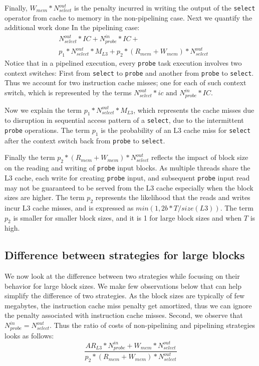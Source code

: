 Finally, $W_{mem} * N^{out}_{select}$ is the penalty incurred in writing the output of the \texttt{select} operator from cache to memory in the non-pipelining case. 
Next we quantify the additional work done In the pipelining case:
\begin{align*}
&N^{out}_{select} * IC + N^{in}_{probe} * IC  + \\
&p_1 * N^{out}_{select} *  M_{L3}  + p_2 * (R_{mem} + W_{mem}) * N^{out}_{select} 
\end{align*}
Notice that in a pipelined execution, every \texttt{probe} task execution involves two context switches: First from \texttt{select} to \texttt{probe} and another from \texttt{probe} to \texttt{select}. 
Thus we account for two instruction cache misses; one for each of such context switch, which is represented by the terms $N^{out}_{select} * ic \text{ and } N^{in}_{probe} * IC$.

Now we explain the term $p_1 * N^{out}_{select} *  M_{L3}$, which represents the cache misses due to disruption in sequential access pattern of a \texttt{select}, due to the intermittent \texttt{probe} operations.
The term $p_1$ is the probability of an L3 cache miss for \texttt{select} after the context switch back from \texttt{probe} to \texttt{select}.

Finally the term $p_2 * (R_{mem} + W_{mem}) * N^{out}_{select}$ reflects the impact of block size on the reading and writing of \texttt{probe} input blocks. 
As multiple threads share the L3 cache, each write for creating \texttt{probe} input, and subsequent \texttt{probe} input read may not be guaranteed to be served from the L3 cache especially when the block sizes are higher.
The term $p_2$ represents the likelihood that the reads and writes incur L3 cache misses, and is expressed as $min (1, 2b * T/ size(L3))$.
The term $p_2$ is smaller for smaller block sizes, and it is 1 for large block sizes and when $T$ is high.

\subsection{Difference between strategies for large blocks}\label{ssec:large-blocks-difference}
We now look at the difference between two strategies while focusing on their behavior for large block sizes. 
We make few observations below that can help simplify the difference of two strategies.
As the block sizes are typically of few megabytes, the instruction cache miss penalty get amortized, thus we can ignore the penalty associated with instruction cache misses. 
Second, we observe that $N^{in}_{probe} = N^{out}_{select}$.
Thus the ratio of costs of non-pipelining and pipelining strategies looks as follows:
\begin{equation*}
\frac{AR_{L3} * N^{in}_{probe} + W_{mem} * N^{out}_{select}}{p_2 * (R_{mem} + W_{mem}) * N^{out}_{select}}
\end{equation*}

